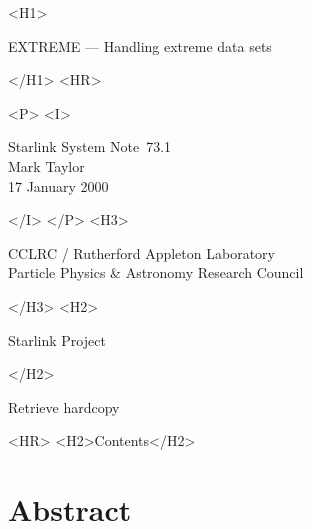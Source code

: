 \documentclass[twoside,11pt]{article}
\newcommand{\stardoccategory}  {Starlink System Note}
\newcommand{\stardocsource}    {ssn\stardocnumber}
\newcommand{\stardocnumber}    {73.1}
\newcommand{\stardocauthors}   {Mark Taylor}
\newcommand{\stardocdate}      {17 January 2000}
\newcommand{\stardoctitle}     {EXTREME --- Handling extreme data sets}
\newcommand{\htmladdnormallink}[2]{#1}
\newcommand{\htmladdimg}[1]{}
\newcommand{\htmlref}[2]{#1}
\newcommand{\htmladdtonavigation}[1]{}
\newcommand{\xlabel}[1]{}
\renewcommand{\_}{\texttt{\symbol{95}}}
\begin{document}
\begin{htmlonly}
   \xlabel{}
   \begin{rawhtml} <H1> \end{rawhtml}
      \stardoctitle
   \begin{rawhtml} </H1> <HR> \end{rawhtml}

   \begin{rawhtml} <P> <I> \end{rawhtml}
   \stardoccategory\ \stardocnumber \\
   \stardocauthors \\
   \stardocdate
   \begin{rawhtml} </I> </P> <H3> \end{rawhtml}
      \htmladdnormallink{CCLRC / Rutherford Appleton Laboratory}
                        {http://www.cclrc.ac.uk} \\
      \htmladdnormallink{Particle Physics \& Astronomy Research Council}
                        {http://www.pparc.ac.uk} \\
   \begin{rawhtml} </H3> <H2> \end{rawhtml}
      \htmladdnormallink{Starlink Project}{http://www.starlink.rl.ac.uk/}
   \begin{rawhtml} </H2> \end{rawhtml}
   \htmladdnormallink{\htmladdimg{source.gif} Retrieve hardcopy}
      {http://www.starlink.rl.ac.uk/cgi-bin/hcserver?\stardocsource}\\

  \label{stardoccontents}
  \begin{rawhtml} 
    <HR>
    <H2>Contents</H2>
  \end{rawhtml}
  \htmladdtonavigation{\htmlref{\htmladdimg{contents_motif.gif}}
        {stardoccontents}}

  \section{\xlabel{abstract}Abstract}

\end{htmlonly}
\end{document}
